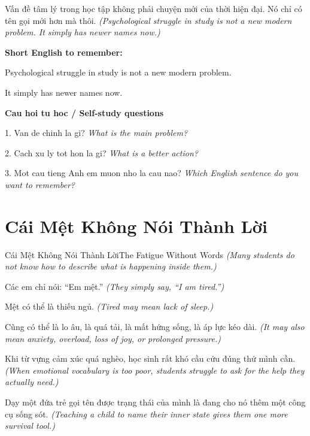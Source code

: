 \begin{baihoc}
Vấn đề tâm lý trong học tập không phải chuyện mới của thời hiện đại. Nó chỉ có tên gọi mới hơn mà thôi.
\textit{(Psychological struggle in study is not a new modern problem. It simply has newer names now.)}
\end{baihoc}

\begin{ghinhoanh}
\textbf{Short English to remember:}

Psychological struggle in study is not a new modern problem.

It simply has newer names now.

\end{ghinhoanh}

\begin{tuhocnhanh}
\textbf{Cau hoi tu hoc / Self-study questions}

1. Van de chinh la gi? \textit{What is the main problem?}

2. Cach xu ly tot hon la gi? \textit{What is a better action?}

3. Mot cau tieng Anh em muon nho la cau nao? \textit{Which English sentence do you want to remember?}
\end{tuhocnhanh}
\ngancach

\section{Cái Mệt Không Nói Thành Lời}
\begin{truyen}{Cái Mệt Không Nói Thành Lời}{The Fatigue Without Words}
\textit{(Many students do not know how to describe what is happening inside them.)}

Các em chỉ nói: ``Em mệt.''
\textit{(They simply say, ``I am tired.'')}

Mệt có thể là thiếu ngủ.
\textit{(Tired may mean lack of sleep.)}

Cũng có thể là lo âu, là quá tải, là mất hứng sống, là áp lực kéo dài.
\textit{(It may also mean anxiety, overload, loss of joy, or prolonged pressure.)}

Khi từ vựng cảm xúc quá nghèo, học sinh rất khó cầu cứu đúng thứ mình cần.
\textit{(When emotional vocabulary is too poor, students struggle to ask for the help they actually need.)}

Dạy một đứa trẻ gọi tên được trạng thái của mình là đang cho nó thêm một công cụ sống sót.
\textit{(Teaching a child to name their inner state gives them one more survival tool.)}

\end{truyen}


